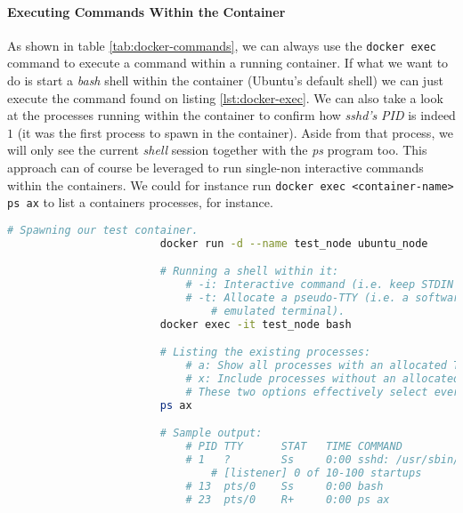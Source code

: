                 \paragraph{Executing Commands Within the Container}
                    As shown in table \ref{tab:docker-commands}, we can always use the \texttt{docker exec} command to execute a command within a running container. If what we want to do is start a \textit{bash} shell within the container (Ubuntu's default shell) we can just execute the command found on listing \ref{lst:docker-exec}. We can also take a look at the processes running within the container to confirm how \textit{sshd's} \textit{PID} is indeed $1$ (it was the first process to spawn in the container). Aside from that process, we will only see the current \textit{shell} session together with the \textit{ps} program too. This approach can of course be leveraged to run single-non interactive commands within the containers. We could for instance run \texttt{docker exec <container-name> ps ax} to list a containers processes, for instance.\\

                    \begin{lstlisting}[language = bash, caption = Inspecting a Container's Processes., label = lst:docker-exec]
                        # Spawning our test container.
                        docker run -d --name test_node ubuntu_node

                        # Running a shell within it:
                            # -i: Interactive command (i.e. keep STDIN open).
                            # -t: Allocate a pseudo-TTY (i.e. a software
                                # emulated terminal).
                        docker exec -it test_node bash

                        # Listing the existing processes:
                            # a: Show all processes with an allocated TTY.
                            # x: Include processes without an allocated TTY.
                            # These two options effectively select every process.
                        ps ax

                        # Sample output:
                            # PID TTY      STAT   TIME COMMAND
                            # 1   ?        Ss     0:00 sshd: /usr/sbin/sshd -D \
                                # [listener] 0 of 10-100 startups
                            # 13  pts/0    Ss     0:00 bash
                            # 23  pts/0    R+     0:00 ps ax
                    \end{lstlisting}

